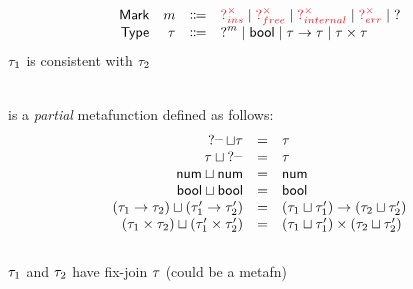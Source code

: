 \documentclass{article}
\begin{document}
\[\begin{array}{rrcl}
  \normalfont\textsf{Mark}     & m & \Coloneqq & \TUnknownErr{ins} \mid \TUnknownErr{free} \mid \TUnknownErr{internal} \mid \TUnknownErr{err} \mid \TUnknown \\
  \TMName  & \TMV  & \Coloneqq & \TUnknown^{m} \mid \TBool \mid \TArrow{\TMV}{\TMV} \mid \TProd{\TMV}{\TMV} \\
\end{array}\]
%
 $\TMV_1$ is consistent with $\TMV_2$
%
\begin{mathpar}




\end{mathpar} \\
%
 is a \emph{partial} metafunction defined as follows:
%
\newcommand{\joinsTo}[3]{\ensuremath{\TJoin{#1}{#2} & = & #3}}
\[\begin{array}{rcl}
  \joinsTo{\TUnknown^{\_}}{\TMV}{\TMV} \\
  \joinsTo{\TMV}{\TUnknown^{\_}}{\TMV} \\
  \joinsTo{\TNum}{\TNum}{\TNum} \\
  \joinsTo{\TBool}{\TBool}{\TBool} \\
  \joinsTo{(\TArrow{\TMV_1}{\TMV_2})}{(\TArrow{\TMV_1'}{\TMV_2'})}{\TArrow{(\TJoin{\TMV_1}{\TMV_1'})}{(\TJoin{\TMV_2}{\TMV_2'})}} \\
  \joinsTo{(\TProd{\TMV_1}{\TMV_2})}{(\TProd{\TMV_1'}{\TMV_2'})}{\TProd{(\TJoin{\TMV_1}{\TMV_1'})}{(\TJoin{\TMV_2}{\TMV_2'})}}
\end{array}\] \\
%
 $\TMV_1$ and $\TMV_2$ have fix-join $\TMV$ (could be a metafn)
\end{document}
